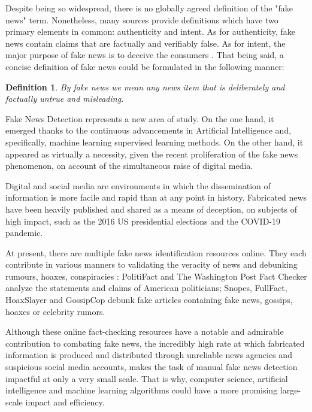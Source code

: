 \documentclass[12pt, a4paper]{article}
\newtheorem{definition}{Definition}
\begin{document}
    Despite being so widespread, there is no globally agreed definition of the "fake news" term. Nonetheless, many sources provide definitions which have two primary elements in common: authenticity and intent. As for authenticity, fake news contain claims that are factually and verifiably false. As for intent, the major purpose of fake news is to deceive the consumers \cite{a2}. That being said, a concise definition of fake news could be formulated in the following manner:

    \begin{definition}
      By fake news we mean any news item that is deliberately and factually untrue and misleading.
    \end{definition}

    Fake News Detection represents a new area of study. On the one hand, it emerged thanks to the continuous advancements in Artificial Intelligence and, specifically, machine learning supervised learning methods. On the other hand, it appeared as virtually a necessity, given the recent proliferation of the fake news phenomenon, on account of the simultaneous raise of digital media.

    Digital and social media are environments in which the dissemination of information is more facile and rapid than at any point in history. Fabricated news have been heavily published and shared as a means of deception, on subjects of high impact, such as the 2016 US presidential elections and the COVID-19 pandemic.
  
    At present, there are multiple fake news identification resources online. They each contribute in various manners to validating the veracity of news and debunking rumours, hoaxes, conspiracies \cite{a10}: PolitiFact and The Washington Post Fact Checker analyze the statements and claims of American politicians; Snopes, FullFact, HoaxSlayer and GossipCop debunk fake articles containing fake news, gossips, hoaxes or celebrity rumors.

    Although these online fact-checking resources have a notable and admirable contribution to combating fake news, the incredibly high rate at which fabricated information is produced and distributed through unreliable news agencies and suspicious social media accounts, makes the task of manual fake news detection impactful at only a very small scale. That is why, computer science, artificial intelligence and machine learning algorithms could have a more promising large-scale impact and efficiency. 
    
\end{document}
